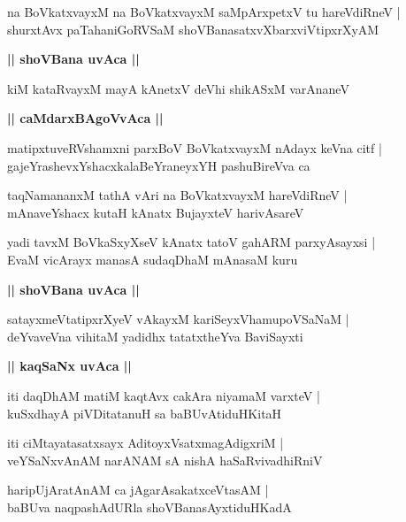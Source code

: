 \documentclass[twoside,12pt,openright]{book}
\newcounter{shloka}[chapter]
\def\uvaca#1{\centerline{{\large\textbf{#1}}}}
\begin{document}
\begin{shloka}%
na BoVkatxvayxM na BoVkatxvayxM saMpArxpetxV tu hareVdiRneV |\\
shurxtAvx paTahaniGoRVSaM shoVBanasatxvXbarxviVtipxrXyAM 
\end{shloka}

\uvaca{|| shoVBana uvAca ||}

\begin{shloka}%
kiM kataRvayxM mayA kAnetxV deVhi shikASxM varAnaneV 
\end{shloka}

\uvaca{|| caMdarxBAgoVvAca ||}

\begin{shloka}%
matipxtuveRVshamxni parxBoV BoVkatxvayxM nAdayx keVna citf |\\
gajeYrashevxYshacxkalaBeYraneyxYH pashuBireVva ca 
\end{shloka}

\begin{shloka}%
taqNamananxM tathA vAri na BoVkatxvayxM hareVdiRneV |\\
mAnaveYshacx kutaH kAnatx BujayxteV harivAsareV 
\end{shloka}

\begin{shloka}%
yadi tavxM BoVkaSxyXseV kAnatx tatoV gahARM parxyAsayxsi |\\
EvaM vicArayx manasA sudaqDhaM mAnasaM kuru
\end{shloka}

\uvaca{|| shoVBana uvAca ||}

\begin{shloka}%
satayxmeVtatipxrXyeV vAkayxM kariSeyxVhamupoVSaNaM |\\
deYvaveVna vihitaM yadidhx tatatxtheYva BaviSayxti
\end{shloka}

\uvaca{|| kaqSaNx uvAca ||}

\begin{shloka}%
iti daqDhAM matiM kaqtAvx cakAra niyamaM varxteV |\\
kuSxdhayA piVDitatanuH sa baBUvAtiduHKitaH
\end{shloka}

\begin{shloka}%
iti ciMtayatasatxsayx AditoyxVsatxmagAdigxriM |\\
veYSaNxvAnAM narANAM sA nishA haSaRvivadhiRniV 
\end{shloka}

\begin{shloka}%
haripUjAratAnAM ca jAgarAsakatxceVtasAM |\\
baBUva naqpashAdURla shoVBanasAyxtiduHKadA 
\end{shloka}
\end{document}
